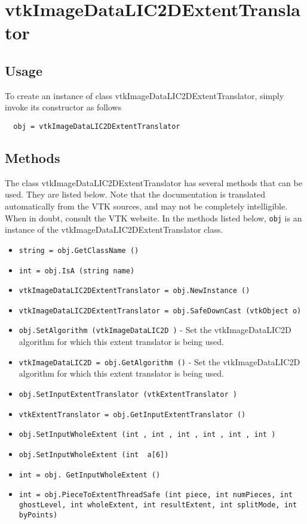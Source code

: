 \section{vtkImageDataLIC2DExtentTranslator}

\subsection{Usage}


To create an instance of class vtkImageDataLIC2DExtentTranslator, simply
invoke its constructor as follows
\begin{verbatim}
  obj = vtkImageDataLIC2DExtentTranslator
\end{verbatim}
\subsection{Methods}

The class vtkImageDataLIC2DExtentTranslator has several methods that can be used.
  They are listed below.
Note that the documentation is translated automatically from the VTK sources,
and may not be completely intelligible.  When in doubt, consult the VTK website.
In the methods listed below, \verb|obj| is an instance of the vtkImageDataLIC2DExtentTranslator class.
\begin{itemize}
\item  \verb|string = obj.GetClassName ()|

\item  \verb|int = obj.IsA (string name)|

\item  \verb|vtkImageDataLIC2DExtentTranslator = obj.NewInstance ()|

\item  \verb|vtkImageDataLIC2DExtentTranslator = obj.SafeDownCast (vtkObject o)|

\item  \verb|obj.SetAlgorithm (vtkImageDataLIC2D )| -  Set the vtkImageDataLIC2D algorithm for which this extent translator is
 being used.

\item  \verb|vtkImageDataLIC2D = obj.GetAlgorithm ()| -  Set the vtkImageDataLIC2D algorithm for which this extent translator is
 being used.

\item  \verb|obj.SetInputExtentTranslator (vtkExtentTranslator )|

\item  \verb|vtkExtentTranslator = obj.GetInputExtentTranslator ()|

\item  \verb|obj.SetInputWholeExtent (int , int , int , int , int , int )|

\item  \verb|obj.SetInputWholeExtent (int  a[6])|

\item  \verb|int = obj. GetInputWholeExtent ()|

\item  \verb|int = obj.PieceToExtentThreadSafe (int piece, int numPieces, int ghostLevel, int wholeExtent, int resultExtent, int splitMode, int byPoints)|

\end{itemize}
